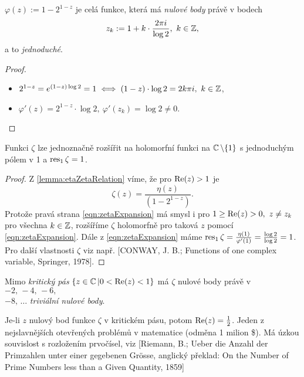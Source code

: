 \begin{lemma}
$\varphi(z):=1-2^{1-z}$ je celá funkce, která má \emph{nulové body} právě v bodech $$z_k:=1+k\cdot\frac{2\pi i}{\log 2},\ k\in \operatorname{\mathbb{Z}},$$ a to \emph{jednoduché}.
\end{lemma}

\begin{proof}\mbox{}
\begin{itemize}
    \item $2^{1-z}=e^{(1-z)\log 2}=1\iff(1-z)\cdot\log2=2k\pi i,\ k\in \operatorname{\mathbb{Z}}$,
    \item $\varphi'(z)=2^{1-z}\cdot\log2,\ \varphi'(z_k)=\log2\neq0$.
\end{itemize}
\end{proof}

\begin{lemma}
Funkci $\zeta$ lze jednoznačně rozšířit na holomorfní funkci na $\operatorname{\mathbb{C}}\setminus\{1\}$ s jednoduchým pólem v 1 a $\operatorname{res}_1\zeta=1$.
\end{lemma}

\begin{proof}
Z \cref{lemma:etaZetaRelation} víme, že pro $\operatorname{Re}(z)>1$ je 
\begin{equation}\tag{*}\label{eqn:zetaExpansion}
    \zeta(z)=\frac{\eta(z)}{\left(1-2^{1-z}\right)}.
\end{equation}
Protože pravá strana \cref{eqn:zetaExpansion} má smysl i pro $1\geq\operatorname{Re}(z)>0,\ z\neq z_k$ pro všechna $k\in\operatorname{\mathbb{Z}}$, rozšíříme $\zeta$ holomorfně pro taková $z$ pomocí \cref{eqn:zetaExpansion}. Dále z \cref{eqn:zetaExpansion} máme $\operatorname{res}_1\zeta=\frac{\eta(1)}{\varphi'(1)}=\frac{\log2}{\log2}=1$.
Pro další vlastnosti $\zeta$ viz např. [CONWAY, J. B.; Functions of one complex variable, Springer, 1978].
\end{proof}

\begin{lemma}
Mimo \emph{kritický pás} $\{z\in\operatorname{\mathbb{C}}|0<\operatorname{Re}(z)<1\}$ má $\zeta$ 
nulové body právě v $-2,\,-4,\,-6,\,$\\$-8,\,\ldots$ \emph{triviální nulové body}.
\end{lemma}
 Je-li $z$ nulový bod funkce $\zeta$ v kritickém pásu, potom $\operatorname{Re}(z)=\frac{1}{2}$. Jeden z nejslavnějších otevřených problémů v matematice (odměna 1 milion \$). Má úzkou souvislost s rozložením prvočísel, viz [Riemann, B.; Ueber die Anzahl der Primzahlen unter
einer gegebenen Grösse, anglický překlad: On the Number of Prime Numbers less than a Given Quantity, 1859]

